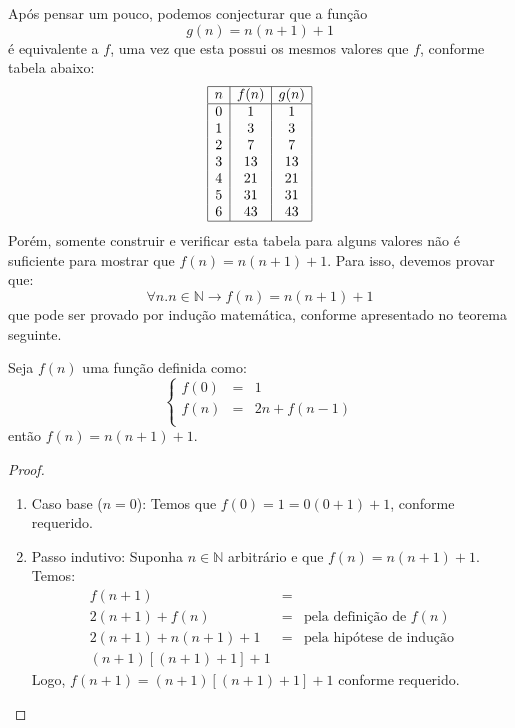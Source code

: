 Após pensar um pouco, podemos conjecturar que a função
\[
g(n) = n (n+1) + 1
\]
é equivalente a $f$, uma vez que esta possui os mesmos valores que
$f$, conforme tabela abaixo:
\[
\begin{array}{|c|c|c|}
  \hline
  n & f(n) & g(n)\\ \hline
  0 &  1  & 1 \\
  1 &  3  & 3 \\
  2 &  7  & 7 \\
  3 & 13 & 13 \\
  4 & 21 & 21 \\
  5 & 31 & 31 \\
  6 & 43 & 43\\ \hline
\end{array}
\]
Porém, somente construir e verificar esta tabela para alguns valores
não é suficiente para mostrar que $f(n) = n(n+1) + 1$. Para isso,
devemos provar que:
\[
\forall n. n\in\mathbb{N} \to f(n) = n(n+1) + 1
\]
que pode ser provado por indução matemática, conforme apresentado no
teorema seguinte.

\begin{Theorem}
Seja $f(n)$ uma função definida como:
\[
\left\{
\begin{array}{lcl}
  f(0) & = & 1 \\
  f(n) & = & 2n + f(n - 1)\\
\end{array}
\right .
\]
então $f(n) = n(n+1) + 1$.
\end{Theorem}
\begin{proof}
\verb| |\\
\begin{enumerate}
  \item[\ ]Caso base ($n = 0$): Temos que $f(0) = 1 = 0(0 +1) + 1$,
    conforme requerido.
  \item[\ ]Passo indutivo: Suponha $n\in\mathbb{N}$ arbitrário e que
    $f(n) = n(n+1) + 1$. Temos:
   \[
      \begin{array}{lcl}
      f(n+1) & = \\
      2 (n+1) + f(n) & = & \text{pela definição de }f(n)\\
      2(n+1) + n(n+1) + 1 & = & \text{pela hipótese de indução}\\
      (n+1)[(n+1) + 1] +1
      \end{array}
   \]
   Logo, $f(n+1) = (n+1)[(n+1) + 1] + 1$ conforme requerido.
\end{enumerate}
\end{proof}

